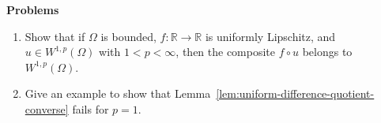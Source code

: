 \textbf{Problems}

\begin{enumerate}[label=\thesection.\arabic*.,ref=\thesection.\arabic*,start=12,series=book-problems]

\item\label{ex:sobolev-composition-uniform-lipschitz-function} Show that if $\Omega$ is bounded, $f:\mathbb{R}\to\mathbb{R}$ is uniformly Lipschitz, and $u\in W^{1,p}(\Omega)$ with $1<p<\infty$, then the composite $f\circ u$ belongs to $W^{1,p}(\Omega)$.

\item\label{ex:difference-quotient-converse-endpoint-failure} Give an example to show that Lemma~\ref{lem:uniform-difference-quotient-converse} fails for $p=1$.

\end{enumerate}
